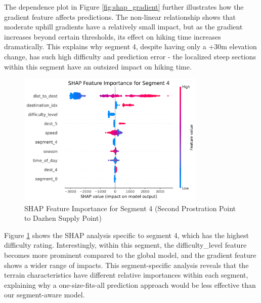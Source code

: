 \documentclass[12pt]{article}
\begin{document}
The dependence plot in Figure \ref{fig:shap_gradient} further illustrates how the gradient feature affects predictions. The non-linear relationship shows that moderate uphill gradients have a relatively small impact, but as the gradient increases beyond certain thresholds, its effect on hiking time increases dramatically. This explains why segment 4, despite having only a +30m elevation change, has such high difficulty and prediction error - the localized steep sections within this segment have an outsized impact on hiking time.

\begin{figure}[H]
\centering
\includegraphics[width=0.8\textwidth]{visualization_results/segment_shap/shap_summary_segment_4.png}
\caption{SHAP Feature Importance for Segment 4 (Second Prostration Point to Dazhen Supply Point)}
\label{fig:shap_segment4}
\end{figure}

Figure \ref{fig:shap_segment4} shows the SHAP analysis specific to segment 4, which has the highest difficulty rating. Interestingly, within this segment, the difficulty\_level feature becomes more prominent compared to the global model, and the gradient feature shows a wider range of impacts. This segment-specific analysis reveals that the terrain characteristics have different relative importances within each segment, explaining why a one-size-fits-all prediction approach would be less effective than our segment-aware model.
\end{document}
